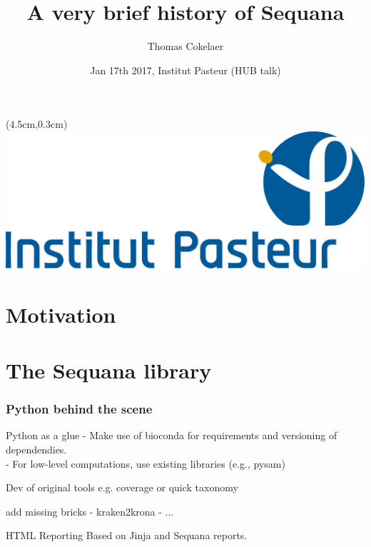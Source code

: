\documentclass{beamer}
\title[Sequana]{A very brief history of Sequana}
\author[T. Cokelaer]{Thomas Cokelaer}
\institute{Institut Pasteur}
\date{Jan 17th 2017, Institut Pasteur (HUB talk)}
\begin{document}

\begin{frame}[plain]
    \titlepage
    \begin{textblock*}{5cm}(4.5cm,0.3cm)
        \includegraphics[scale=0.09]{images/Institut_Pasteur.png}
    \end{textblock*}
\end{frame}


\section{Motivation}







\section{The Sequana library}

\begin{frame}
\frametitle{Python behind the scene}
 \begin{block}{Python as a glue}
     - Make use of bioconda for requirements and versioning of dependendies. \\
     - For low-level computations, use existing libraries (e.g., pysam)
 \end{block}
 
 \begin{block}{Dev of original tools}
  e.g. coverage or quick taxonomy 
 \end{block}
 
 \begin{block}{add missing bricks}
  - kraken2krona
  - ...
 \end{block}

 \begin{block}{HTML Reporting}
  Based on Jinja and Sequana reports.
 \end{block}
\end{frame}
\end{document}

